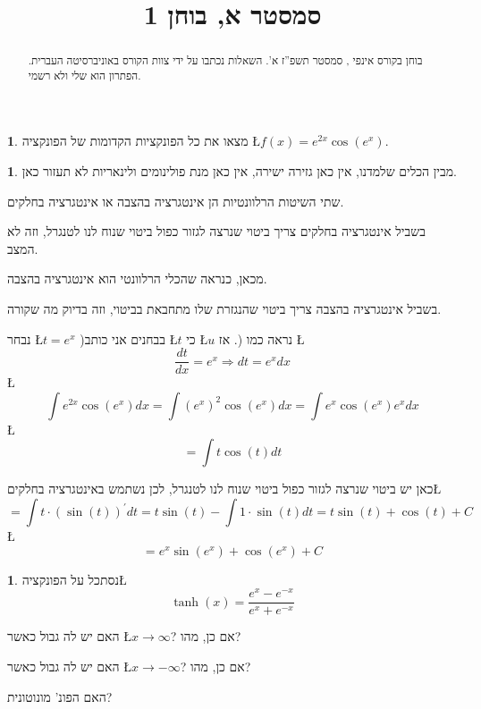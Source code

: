 \documentclass[english,hebrew]{article}
\theoremstyle{plain}
\theoremstyle{definition}
\newtheorem{problem}[thm]{\protect\problemname}
\theoremstyle{definition}
\newtheorem*{sol*}{\protect\solutionname}
\providecommand{\problemname}{בעיה}
\providecommand{\solutionname}{פתרון}
\begin{document}
\title{סמסטר {\endL}א, בוחן {\beginL \vspace{-1em}1\endL}}
\maketitle
\begin{abstract}
בוחן {\endL} בקורס אינפי {\endL}, סמסטר תשפ\textquotedblright ז
א'. השאלות נכתבו על ידי צוות הקורס באוניברסיטה העברית. הפתרון הוא
שלי ולא רשמי. \\
\end{abstract}
\begin{problem}
מצאו את כל הפונקציות הקדומות של הפונקציה \L{$f(x)=e^{2x}\cos\left(e^{x}\right)$}.
\end{problem}

\begin{sol*}
מבין הכלים שלמדנו, אין כאן גזירה ישירה, אין כאן מנת פולינומים ולינאריות
לא תעזור כאן. 

שתי השיטות הרלוונטיות הן אינטגרציה בהצבה או אינטגרציה בחלקים. 

בשביל אינטגרציה בחלקים צריך ביטוי שנרצה לגזור כפול ביטוי שנוח לנו
לטנגרל, וזה לא המצב.

מכאן, כנראה שהכלי הרלוונטי הוא אינטגרציה בהצבה.

בשביל אינטגרציה בהצבה צריך ביטוי שהנגזרת שלו מתחבאת בביטוי, וזה בדיוק
מה שקורה.

נבחר \L{$t=e^{x}$} )בבחנים אני כותב \L{$t$} כי \L{$u$} נראה כמו
{\endL}(. אז \L{%
\[
\frac{dt}{dx}=e^{x}\Rightarrow dt=e^{x}dx
\]
}%
\L{%
\[
\int e^{2x}\cos\left(e^{x}\right)dx=\int\left(e^{x}\right)^{2}\cos\left(e^{x}\right)dx=\int e^{x}\cos\left(e^{x}\right)e^{x}dx
\]
}%
\L{%
\[
=\int t\cos\left(t\right)dt
\]
}%

כאן יש ביטוי שנרצה לגזור כפול ביטוי שנוח לנו לטנגרל, לכן נשתמש באינטגרציה
בחלקים\L{%
\[
=\int t\cdot\left(\sin(t)\right)^{'}dt=t\sin(t)-\int1\cdot\sin(t)dt=t\sin(t)+\cos(t)+C
\]
}%
\L{%
\[
=e^{x}\sin\left(e^{x}\right)+\cos\left(e^{x}\right)+C
\]
}%
\end{sol*}
\begin{problem}
נסתכל על הפונקציה\L{%
\[
\tanh(x)=\frac{e^{x}-e^{-x}}{e^{x}+e^{-x}}
\]
}%

האם יש לה גבול כאשר \L{$x\rightarrow\infty$}? אם כן, מהו?

האם יש לה גבול כאשר \L{$x\rightarrow-\infty$}? אם כן, מהו?

האם הפונ' מונוטונית?
\end{problem}
\end{document}

